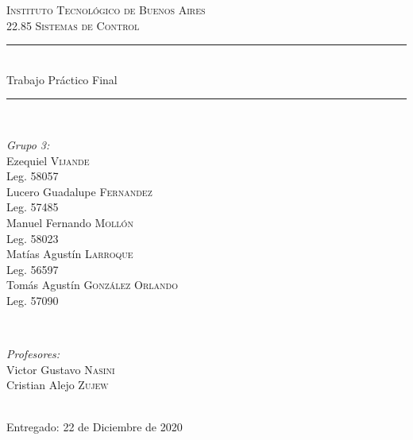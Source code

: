 %
\begin{titlepage}
\newcommand{\HRule}{\rule{\linewidth}{0.5mm}}       
\center        
\textsc{\LARGE Instituto Tecnológico de Buenos Aires}\\[2cm]  
\textsc{\Large 22.85 Sistemas de Control}\\[1.5cm]  
\HRule \\[0.5cm] 
{ \huge Trabajo Práctico Final}
\\[0.4cm]  \HRule \\[2cm]       
\begin{minipage}{0.4\textwidth} \begin{flushleft} \large 
\emph{Grupo 3:}\\		 [.3cm]
Ezequiel \textsc{Vijande}\\ Leg. 58057 \\  [.3cm] 
Lucero Guadalupe \textsc{Fernandez}\\ Leg. 57485 \\  [.3cm]
Manuel Fernando \textsc{Mollón}\\ Leg. 58023 \\  [.3cm]
Matías Agustín \textsc{Larroque}\\ Leg. 56597 \\  [.3cm]
Tomás Agustín \textsc{González Orlando}\\ Leg. 57090 \\  [.3cm] 
\end{flushleft} \end{minipage} ~ 
\begin{minipage}{0.4\textwidth} \begin{flushright} \large 
\emph{Profesores:} \\ [.3cm] 
Victor Gustavo  \textsc{Nasini}\\
Cristian Alejo  \textsc{Zujew}\\
\end{flushright} \end{minipage}\\[2cm]      
\vfill {\large Entregado: 22 de Diciembre de 2020}\\[2cm]      \vfill       
\end{titlepage}%

